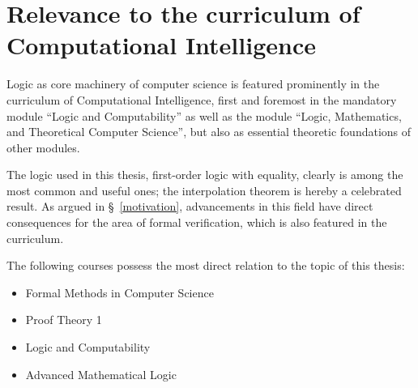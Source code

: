 \documentclass[,%
			paper=a4,%
			DIV11,
			liststotoc,
			bibtotoc,
			draft=false,%
			numbers=noendperiod
			]{scrartcl}
\theoremstyle{definition}
\begin{document}
\section{Relevance to the curriculum of Computational Intelligence}

Logic as core machinery of computer science is featured prominently in the curriculum of Computational Intelligence, first and foremost in the mandatory module ``Logic and Computability'' as well as the module ``Logic, Mathematics, and Theoretical Computer Science'', but also as essential theoretic foundations of other modules. 

The logic used in this thesis, first-order logic with equality, clearly is among the most common and useful ones; the interpolation theorem is hereby a celebrated result.
As argued in \S~\ref{motivation}, advancements in this field have direct consequences for the area of formal verification, which is also featured in the curriculum.

The following courses possess the most direct relation to the topic of this thesis: 
\begin{itemize}
	\item Formal Methods in Computer Science
	\item Proof Theory 1 
	\item Logic and Computability 
	\item Advanced Mathematical Logic 
\end{itemize}


\nocite{*} %


\end{document}
